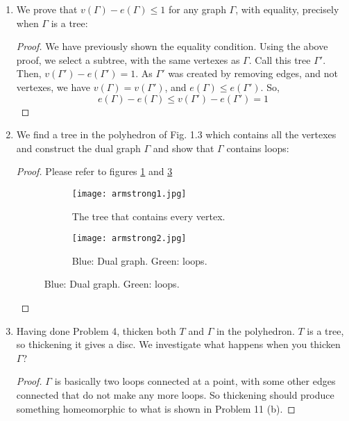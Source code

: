 \documentclass{book}
\begin{document}
\begin{enumerate}
    \item We prove that $v(\Gamma) - e(\Gamma) \leq 1$ for any graph $\Gamma$, with equality, precisely when $\Gamma$ is a tree: 
        \begin{proof} We have previously shown the equality condition. Using the above proof, we select a subtree, with the same vertexes as $\Gamma$. Call this tree $\Gamma'$. Then, $v(\Gamma') - e(\Gamma') = 1$. As $\Gamma'$ was created by removing edges, and not vertexes, we have $v(\Gamma) = v(\Gamma')$, and $e(\Gamma) \leq e(\Gamma')$. So, 
            $$e(\Gamma) - e(\Gamma) \leq v(\Gamma') - e(\Gamma') = 1$$
        \end{proof}

    \item We find a tree in the polyhedron of Fig. 1.3 which contains all the vertexes and construct the dual graph $\Gamma$ and show that $\Gamma$ contains loops:
        \begin{proof} Please refer to figures \hyperref[fig:sub1.1]{\ref{fig:sub1.1}} and \hyperref[fig:sub1.2]{\ref{fig:sub1.2}} 
            \begin{figure}
                \centering
                \begin{subfigure}{.5\textwidth}
                    \centering
                    \texttt{[image: armstrong1.jpg]}
                    \caption{The tree that contains every vertex.}
                    \label{fig:sub1.1}
                \end{subfigure}%
                \begin{subfigure}{.5\textwidth}
                    \centering
                    \texttt{[image: armstrong2.jpg]}
                    \caption{Blue: Dual graph. Green: loops.}
                    \label{fig:sub1.2}
                \end{subfigure}
            \end{figure}
        \end{proof}

    \item Having done  Problem 4, thicken both $T$ and $\Gamma$ in the polyhedron.  $T$ is a tree, so thickening it gives a disc.  We investigate what happens when you thicken $\Gamma$?
        \begin{proof}  $\Gamma$ is basically two loops connected at a point, with some other edges connected that do not make any more loops.  So thickening should produce something homeomorphic to what is shown in Problem 11 (b).
        \end{proof}


\end{enumerate}
\end{document}
